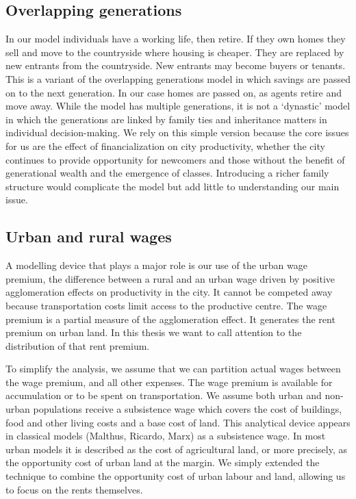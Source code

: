 {\subsection{Overlapping generations}
In our model individuals have a working life, then retire. If they own homes they sell and move to the countryside where housing is cheaper. They are replaced by new entrants from the countryside. New entrants may become buyers or tenants. This is a variant of the \gls{overlapping generations}  model in which savings are passed on to the next generation. In our case homes are passed on, as agents retire and move away. While the model has multiple generations, it is not a `dynastic' model in which the generations are linked by family ties and inheritance matters in individual decision-making. We rely on this simple version because the core issues for us are  the effect of financialization on city productivity, whether the city continues to provide opportunity for newcomers and those without the benefit of generational wealth and the emergence of classes. Introducing a richer family structure would complicate the model but add little to understanding  our  main  issue. 

\subsection{Urban and rural wages}
A modelling device that plays a major role is our use of the \gls{urban wage premium}, the difference between a rural and an urban wage driven by positive \gls{agglomeration effect}s on productivity in the city. It cannot be competed away because transportation costs limit access to the productive centre. The wage premium is a partial measure of the agglomeration effect. It generates the \gls{rent premium} on urban land. In this thesis we want to call attention to the distribution of that rent premium.

To simplify the analysis, we assume that we can partition actual wages between the wage premium,  and all other expenses. The wage premium  is available for accumulation or to be spent on transportation. We assume both urban and non-urban populations  receive a \gls{subsistence wage} which covers  the cost of buildings, food and other living costs and a base cost of land. This analytical device appears in classical models (Malthus, Ricardo, Marx) as a subsistence wage. In most urban models it is described as the cost of agricultural land, or more precisely,  as the opportunity cost of urban land at the margin. We simply extended the technique to combine the opportunity cost of urban labour and land, allowing us to focus on the rents themselves. 


}
